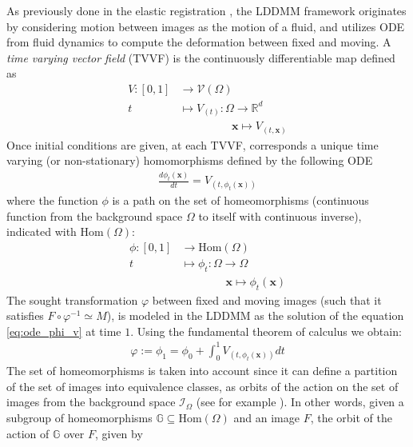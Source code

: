 As previously done in the elastic registration \cite{Broit:1981}, the LDDMM framework \cite{beg2005computing} originates by considering motion between images as the motion of a fluid, and utilizes ODE from fluid dynamics to compute the deformation between fixed and moving. 
 A \emph{time varying vector field} (TVVF) is the continuously differentiable map defined as
 \begin{align*}
 	V:[0,1] & \longrightarrow  \mathcal{V}(\Omega)\\
 	t  &\longmapsto  V_{(t)}  : \Omega \longrightarrow   \mathbb{R}^{d} \\
 	& \qquad \quad \quad ~~~\mathbf{x} \longmapsto V_{(t,\mathbf{x} )}
 \end{align*}
 Once initial conditions are given, at each TVVF, corresponds a unique time varying (or non-stationary) homomorphisms defined  by the following ODE 
 \begin{align}\label{eq:ode_phi_v}
 	\frac{d\phi_{t} (\mathbf{x})}{dt} = V_{(t,\phi_{t} (\mathbf{x}) )}
 \end{align}
 where the function $\phi$ is a path on the set of homeomorphisms  (continuous function from the background space $\Omega$ to itself with continuous inverse), indicated with $\text{Hom}(\Omega)$:
 \begin{align*}
 	\phi : [0,1] & \longrightarrow  \text{Hom}(\Omega)\\
 	t  &\longmapsto \phi_{t}  : \Omega \longrightarrow    \Omega \\
 	& \qquad \quad \quad  \mathbf{x} \longmapsto \phi_{t}  (\mathbf{x} )
 \end{align*}
The sought transformation $\varphi$ between fixed and moving images (such that it satisfies $ F\circ \varphi^{-1} \simeq M $), is modeled in the LDDMM as the solution of the equation \ref{eq:ode_phi_v} at time $1$. Using the fundamental theorem of calculus we obtain:
 \begin{align*}
 	\varphi := \phi_{1} = \phi_{0} + \int_0^1 V_{(t,\phi_{t} (\mathbf{x}) )} dt
 \end{align*}
The set of homeomorphisms is taken into account since it can define a partition of the set of images into equivalence classes, as orbits of the action on the set of images from the background space $\mathcal{I}_{\Omega}$ (see for example \cite{artin2011algebra}). In other words, given a subgroup of homeomorphisms $\mathbb{G}\subseteq \text{Hom}(\Omega)$ and an image $F$, the orbit of the action of $\mathbb{G}$ over $F$, given by

